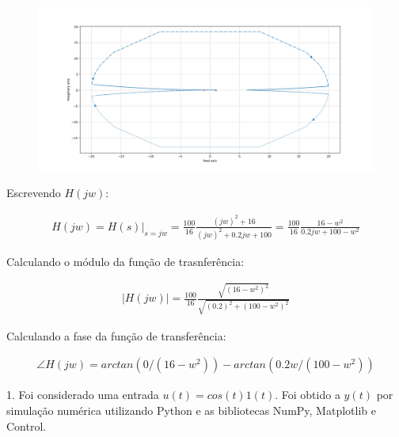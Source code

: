 \documentclass[10pt]{article}
\begin{document}
\begin{figure}[h]
    \includegraphics[scale=0.45]{nyquist.png}
    \centering
\end{figure}

Escrevendo $H(jw)$:

\begin{align*}
    H(jw) = H(s)|_{s=jw} = \frac{100}{16} \frac{(jw)^2 + 16}{(jw)^2 + 0.2jw + 100} = \frac{100}{16} \frac{16 - w^2}{0.2jw + 100 - w^2}
\end{align*}

Calculando o módulo da função de trasnferência:

\begin{align*}
    |H(jw)| = \frac{100}{16} \frac{\sqrt{(16 - w^2)^2}}{\sqrt{(0.2)^2 + (100 - w^2)^2}}
\end{align*}

Calculando a fase da função de transferência:

\begin{align*}
    \angle H(jw) = arctan(0/(16 - w^2)) - arctan(0.2w/(100 - w^2))
\end{align*}

1. Foi considerado uma entrada $u(t) = cos(t) 1(t)$. Foi obtido a $y(t)$ por simulação numérica utilizando Python
e as bibliotecas NumPy, Matplotlib e Control.
\end{document}
